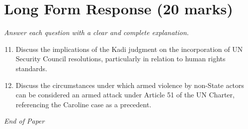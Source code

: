 \documentclass[12pt]{article}
\begin{document}
\section*{Long Form Response (20 marks)}
\textit{Answer each question with a clear and complete explanation.}
\begin{enumerate}[label=\arabic*.]
\setcounter{enumi}{10}
\item Discuss the implications of the Kadi judgment on the incorporation of UN Security Council resolutions, particularly in relation to human rights standards.
\item Discuss the circumstances under which armed violence by non-State actors can be considered an armed attack under Article 51 of the UN Charter, referencing the Caroline case as a precedent.
\end{enumerate}

\vfill
\noindent\textit{End of Paper}
\end{document}
